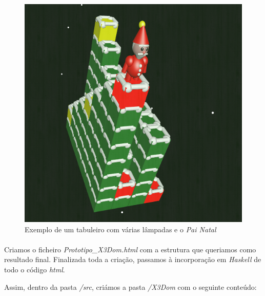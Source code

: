 \documentclass[a4paper,12pt]{article}
\begin{document}
\begin{figure}[h!]
\centering
\includegraphics[scale=0.5]{./imagens/X3Dom.png}
\caption{Exemplo de um tabuleiro com várias lâmpadas e o \emph{Pai Natal}} \label{Fig:X3Dom}
\end{figure}

\paragraph{}
Criamos o ficheiro \emph{Prototipo\_X3Dom.html} com a estrutura que queriamos como resultado final.
Finalizada toda a criação, passamos à incorporação em \emph{Haskell} de todo o código \emph{html}.

Assim, dentro da pasta \emph{/src}, criámos a pasta \emph{/X3Dom} com o seguinte conteúdo:
\end{document}
